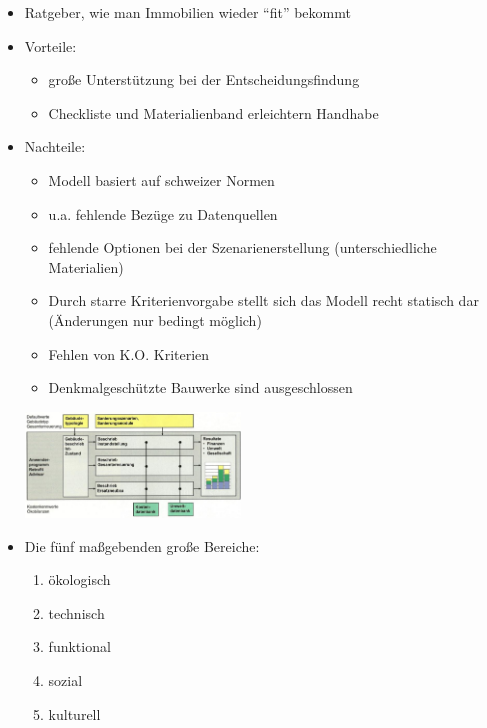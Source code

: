 \documentclass[fleqn,twoside,dvipsnames]{article}
\begin{document}
\begin{itemize}
\begin{itemize}
                    \item Ratgeber, wie man Immobilien wieder \enquote{fit} bekommt
                    \item Vorteile: 
                        \begin{itemize}
                            \item große Unterstützung bei der Entscheidungsfindung
                            \item Checkliste und Materialienband erleichtern Handhabe
                        \end{itemize}
                    \item Nachteile:
                        \begin{itemize}
                            \item Modell basiert auf schweizer Normen
                            \item u.a. fehlende Bezüge zu Datenquellen
                            \item fehlende Optionen bei der Szenarienerstellung (unterschiedliche Materialien)
                            \item Durch starre Kriterienvorgabe stellt sich das Modell recht statisch dar (Änderungen nur bedingt möglich)
                            \item Fehlen von K.O. Kriterien
                            \item Denkmalgeschützte Bauwerke sind ausgeschlossen
                \end{itemize}
                \includegraphics[width=0.45\textwidth]{Grafiken/Abriss und Neubau oder Sanierung/Retrofit Advisor.png}
            \item Die fünf maßgebenden große Bereiche:
                \begin{enumerate}
                    \item ökologisch
                    \item technisch
                    \item funktional
                    \item sozial
                    \item kulturell
                \end{enumerate}
        \end{itemize}
    \end{itemize}
\end{document}
